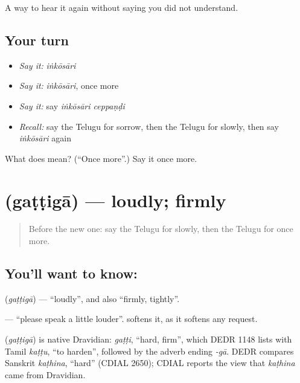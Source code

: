 \begin{grammarlens}[title={What you've built}]
A way to hear it again without saying you did not understand.
\end{grammarlens}

\subsection*{Your turn}
\begin{itemize}
\raggedright
  \item \emph{Say it:} \emph{iṅkōsāri}
  \item \emph{Say it:} \emph{iṅkōsāri}, once more
  \item \emph{Say it:} say \emph{iṅkōsāri ceppaṇḍi}
  \item \emph{Recall:} say the Telugu for sorrow, then the Telugu for slowly, then say \emph{iṅkōsāri} again
\end{itemize}

\begin{tcolorbox}[breakable,colback=teal!4,colframe=teal!35!black,title={Before you move on}]
What does  mean? (\textquotedblleft{}Once more\textquotedblright{}.) Say it once more.
\end{tcolorbox}
\section[\texorpdfstring{\te{గట్టిగా} (gaṭṭigā)}{గట్టిగా (gaṭṭigā)}]{ (gaṭṭigā) — loudly; firmly}

\label{lesson:TE-C86-loudly}



\begin{quote}
Before the new one: say the Telugu for slowly, then the Telugu for once more.
\end{quote}

\subsection*{You'll want to know: }
\textbf{} (\emph{gaṭṭigā}) — \textquotedblleft{}loudly\textquotedblright{}, and also \textquotedblleft{}firmly, tightly\textquotedblright{}.

\textbf{  } — \textquotedblleft{}please speak a little louder\textquotedblright{}. \textbf{} softens it, as it softens any request.

\begin{cousinweb}
\textbf{} (\emph{gaṭṭigā}) is native Dravidian: \emph{gaṭṭi}, \textquotedblleft{}hard, firm\textquotedblright{}, which DEDR 1148 lists with Tamil \emph{kaṭṭu}, \textquotedblleft{}to harden\textquotedblright{}, followed by the adverb ending \emph{-gā}. DEDR compares Sanskrit \emph{kaṭhina}, \textquotedblleft{}hard\textquotedblright{} (CDIAL 2650); CDIAL reports the view that \emph{kaṭhina} came from Dravidian.
\end{cousinweb}

